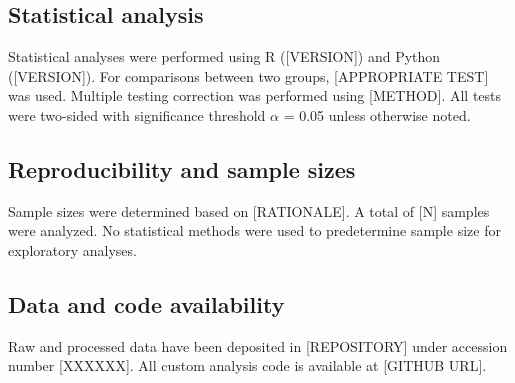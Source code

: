 
\subsection*{Statistical analysis}
Statistical analyses were performed using R ([VERSION]) and Python ([VERSION]). For comparisons between two groups, [APPROPRIATE TEST] was used. Multiple testing correction was performed using [METHOD]. All tests were two-sided with significance threshold $\alpha$ = 0.05 unless otherwise noted.

\subsection*{Reproducibility and sample sizes}
Sample sizes were determined based on [RATIONALE]. A total of [N] samples were analyzed. No statistical methods were used to predetermine sample size for exploratory analyses.

\subsection*{Data and code availability}
Raw and processed data have been deposited in [REPOSITORY] under accession number [XXXXXX]. All custom analysis code is available at [GITHUB URL].

